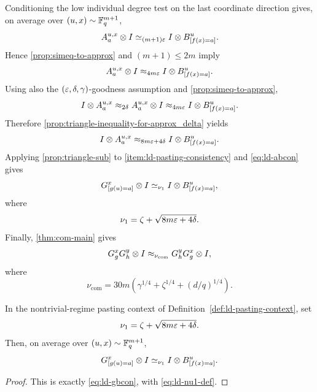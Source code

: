 Conditioning the low individual degree test on the last coordinate direction gives, on average over $(u,x) \sim \mathbb{F}_q^{m+1}$,
\[
	A_a^{u,x} \otimes I \simeq_{(m+1)\varepsilon} I \otimes B^u_{[f(x)=a]}.
\]
Hence \ref{prop:simeq-to-approx} and $(m+1)\le 2m$ imply
\[
	A_a^{u,x} \otimes I \approx_{4m\varepsilon} I \otimes B^u_{[f(x)=a]}.
\]
Using also the $(\varepsilon,\delta,\gamma)$-goodness assumption and \ref{prop:simeq-to-approx},
\[
	I \otimes A_a^{u,x} \approx_{2\delta} A_a^{u,x} \otimes I \approx_{4m\varepsilon} I \otimes B^u_{[f(x)=a]}.
\]
Therefore \ref{prop:triangle-inequality-for-approx_delta} yields
\begin{equation}\label{eq:ld-abcon}
	I \otimes A_a^{u,x} \approx_{8m\varepsilon+4\delta} I \otimes B^u_{[f(x)=a]}.
\end{equation}
Applying \ref{prop:triangle-sub} to \ref{item:ld-pasting-consistency} and \ref{eq:ld-abcon} gives
\begin{equation}\label{eq:ld-gbcon}
	G^x_{[g(u)=a]} \otimes I \simeq_{\nu_1} I \otimes B^u_{[f(x)=a]},
\end{equation}
where
\begin{equation}\label{eq:ld-nu1-def}
	\nu_1 = \zeta + \sqrt{8m\varepsilon+4\delta}.
\end{equation}
Finally, \ref{thm:com-main} gives
\begin{equation}\label{eq:complete-slice-commutativity}
	G_g^x G_h^y \otimes I \approx_{\nu_{\mathrm{com}}} G_h^y G_g^x \otimes I,
\end{equation}
where
\[
	\nu_{\mathrm{com}} = 30m\left(\gamma^{1/4}+\zeta^{1/4}+(d/q)^{1/4}\right).
\]

\begin{lemma}\label{lem:ld-gbcon}
	\leanok
	In the nontrivial-regime pasting context of Definition~\ref{def:ld-pasting-context}, set
	\[
		\nu_1 = \zeta + \sqrt{8m\varepsilon+4\delta}.
	\]
	Then, on average over $(u,x) \sim \mathbb{F}_q^{m+1}$,
	\[
		G^x_{[g(u)=a]} \otimes I \simeq_{\nu_1} I \otimes B^u_{[f(x)=a]}.
	\]
\end{lemma}
\begin{proof}
	\leanok
	This is exactly \ref{eq:ld-gbcon}, with \ref{eq:ld-nu1-def}.
\end{proof}

